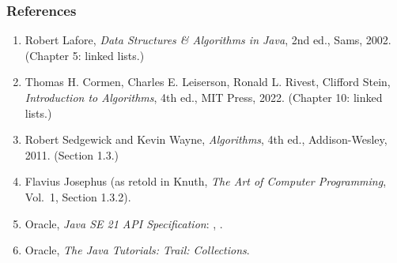 \documentclass[aspectratio=169,10pt,compress]{beamer}
\begin{document}
\begin{frame}[t,fragile] \frametitle{References}
  \begin{enumerate}\small
    \item Robert Lafore, \emph{Data Structures \& Algorithms in Java},
          2nd ed., Sams, 2002. (Chapter 5: linked lists.)
    \item Thomas H. Cormen, Charles E. Leiserson, Ronald L. Rivest,
          Clifford Stein, \emph{Introduction to Algorithms},
          4th ed., MIT Press, 2022. (Chapter 10: linked lists.)
    \item Robert Sedgewick and Kevin Wayne, \emph{Algorithms},
          4th ed., Addison-Wesley, 2011. (Section 1.3.)
    \item Flavius Josephus (as retold in Knuth, \emph{The Art of
          Computer Programming}, Vol.~1, Section 1.3.2).
    \item Oracle, \emph{Java SE 21 API Specification}:
          ,
          .
    \item Oracle, \emph{The Java Tutorials: Trail: Collections}.
  \end{enumerate}
\end{frame}




\begin{frame}[t,fragile]
  \begin{center}
    \vspace{4cm}
  \end{center}
\end{frame}
\end{document}
